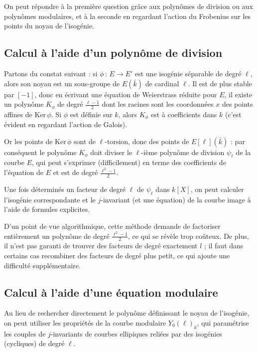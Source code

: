 \documentclass[11pt,a4paper]{article}
\newcommand{\vers}{\rightarrow}
\newcommand{\de}{\,:\,}
\theoremstyle{definition}
\begin{document}
On peut répondre à la première question grâce aux polynômes de division ou aux polynômes modulaires, et à la seconde en regardant l'action du Frobenius sur les points du noyau de l'isogénie.



\newpage

\subsection{Calcul à l'aide d'un polynôme de division}

Partons du constat suivant : si $\phi\de E\vers E'$ est une isogénie séparable de degré $\ell$, alors son noyau est un sous-groupe de $E(\bar{k})$ de cardinal $\ell$. Il est de plus stable par $[-1]$, donc en écrivant une équation de Weierstrass réduite pour $E$, il existe un polynôme $K_\phi$ de degré $\frac{\ell-1}{2}$ dont les racines sont les coordonnées $x$ des points affines de Ker\,$\phi$. Si $\phi$ est définie sur $k$, alors $K_\phi$ est à coefficients dans $k$ (c'est évident en regardant l'action de Galois).

Or les points de Ker\,$\phi$ sont de $\ell$-torsion, donc des points de $E[\ell](\bar{k})$ : par conséquent le polynôme $K_\phi$ doit diviser le $\ell$-ième polynôme de division $\psi_\ell$ de la courbe $E$, qui peut s'exprimer (difficilement) en terme des coefficients de l'équation de $E$ et est de degré $\frac{\ell^2-1}{2}$.

Une fois déterminés un facteur de degré $\ell$ de $\psi_\ell$ dans $k[X]$, on peut calculer l'isogénie correspondante et le $j$-invariant (et une équation) de la courbe image à l'aide de formules explicites.

D'un point de vue algorithmique, cette méthode demande de factoriser entièrement un polynôme de degré $\frac{\ell^2-1}{2}$, ce qui se révèle trop coûteux. De plus, il n'est pas garanti de trouver des facteurs de degré exactement $l$ ; il faut dans certains cas recombiner des facteurs de degré plus petit, ce qui ajoute une difficulté supplémentaire.


\newpage

\subsection{Calcul à l'aide d'une équation modulaire}

Au lieu de rechercher directement le polynôme définissant le noyau de l'isogénie, on peut utiliser les propriétés de la courbe modulaire $Y_0(\ell)_k$, qui paramétrise les couples de $j$-invariants de courbes ellipiques reliées par des isogénies (cycliques) de degré $\ell$. 
\end{document}
